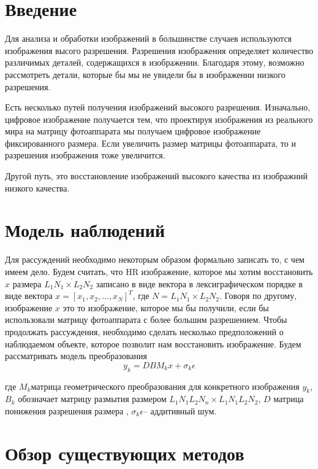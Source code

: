 
\section*{Введение}

Для анализа и обработки изображений в большинстве случаев используются
изображения высого разрешения. Разрешения изображения определяет количество
различимых деталей, содержащихся в изображении. Благодаря этому, возможно
рассмотреть детали, которые бы мы не увидели бы в изображении низкого
разрешения.

Есть несколько путей получения изображений высокого разрешения. Изначально,
цифровое изображение получается тем, что проектируя изображения из
реального мира на матрицу фотоаппарата мы получаем цифровое изображение
фиксированного размера. Если увеличить размер матрицы фотоаппарата,
то и разрешения изображения тоже увеличится.

Другой путь, это восстановление изображений высокого качества из изображний
низкого качества.


\section{Модель наблюдений}

Для рассуждений необходимо некоторым образом формально записать то,
с чем имеем дело. Будем считать, что HR изображение, которое мы хотим
восстановить $x$ размера $L_{1}\dot{N_{1}\times L_{2}N_{2}}$ записано
в виде вектора в лексиграфическом порядке в виде вектора $x=[x_{1},x_{2},\dots,x_{N}]^{T}$,
где $N=L_{1}\dot{N_{1}\times L_{2}N_{2}}$. Говоря по другому, изображение
$x$ это то изображение, которое мы бы получили, если бы использовали
матрицу фотоаппарата с более большим разрешением. Чтобы продолжать
рассуждения, необходимо сделать несколько предположений о наблюдаемом
объекте, которое позволит нам восстановить изображение. Будем рассматривать
модель преобразования
\[
y_{k}=DBM_{k}x+\sigma_{k}\epsilon
\]


где $M_{k}$матрица геометрического преобразования для конкретного
изображения $y_{k}$, $B_{k}$ обозначает матрицу размытия размером
$L_{1}N_{1}L_{2}N_{n}\times L_{1}N_{1}L_{2}N_{2}$, $D$ матрица понижения
разрешения размера , $\sigma_{k}\epsilon$-- аддитивный шум.


\section{Обзор существующих методов}

